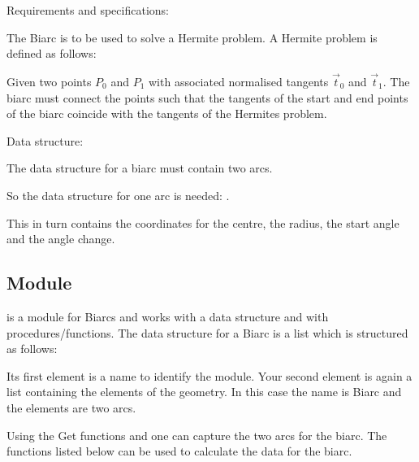 Requirements and specifications:

The Biarc is to be used to solve a Hermite problem. A Hermite problem is defined as follows:

Given two points $P_0$ and $P_1$ with associated normalised tangents $\vec{t}_0$ and $\vec{t}_1$. The biarc must connect the points such that the tangents of the start and end points of the biarc coincide with the tangents of the Hermites problem.


Data structure:

The data structure  for a biarc must contain two arcs.

So the data structure for one arc is needed: .

This in turn contains the coordinates for the centre, the radius, the start angle and the angle change.

\subsection{Module }

 is a module for Biarcs and works with a data structure and with procedures/functions. The data structure  for a Biarc is a list which is structured as follows:

\medskip


\medskip

Its first element is a name to identify the module. Your second element is again a list containing the elements of the geometry. In this case the name is \glqq Biarc\grqq{} and the elements are two arcs.

Using the Get functions  and  one can capture the two arcs for the biarc. The functions listed below can be used to calculate the data for the biarc. 


